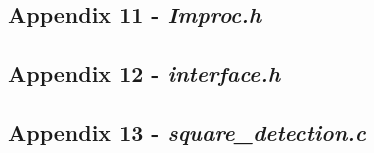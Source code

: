 \subsection{Appendix 11 - \textit{Improc.h}}\label{A11}

\newpage

\subsection{Appendix 12 - \textit{interface.h}}\label{A12}

\newpage

\subsection{Appendix 13 - \textit{square\_detection.c}}\label{A13}

 

